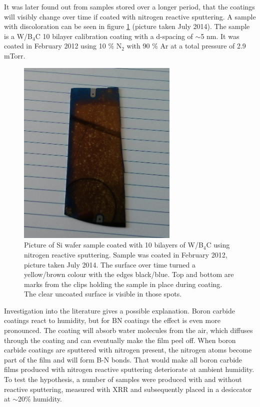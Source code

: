 It was later found out from samples stored over a longer period, that the coatings will visibly change over time if coated with nitrogen reactive sputtering. A sample with discoloration can be seen in figure \ref{fig:discolor} (picture taken July 2014). The sample is a W/B$_4$C 10 bilayer calibration coating with a d-spacing of $\sim$5 nm. It was coated in February 2012 using 10 \% N$_2$ with 90 \% Ar at a total pressure of 2.9 mTorr.

\begin{figure}[!h]
	\center	\includegraphics[height=9cm]{figures/athena/coatings/si5556.jpg}
\caption{\footnotesize Picture of Si wafer sample coated with 10 bilayers of W/B$_4$C using nitrogen reactive sputtering. Sample was coated in February 2012, picture taken July 2014. The surface over time turned a yellow/brown colour with the edges black/blue. Top and bottom are marks from the clips holding the sample in place during coating. The clear uncoated surface is visible in those spots.}\label{fig:discolor}
\end{figure}

Investigation into the literature gives a possible explanation. Boron carbide coatings react to humidity, but for BN coatings the effect is even more pronounced. The coating will absorb water molecules from the air, which diffuses through the coating and can eventually make the film peel off\cite{Cardinale:1994ha}. When boron carbide coatings are sputtered with nitrogen present, the nitrogen atoms become part of the film and will form B-N bonds. That would make all boron carbide films produced with nitrogen reactive sputtering deteriorate at ambient humidity. To test the hypothesis, a number of samples were produced with and without reactive sputtering, measured with XRR and subsequently placed in a desiccator at $\sim$20\% humidity.

